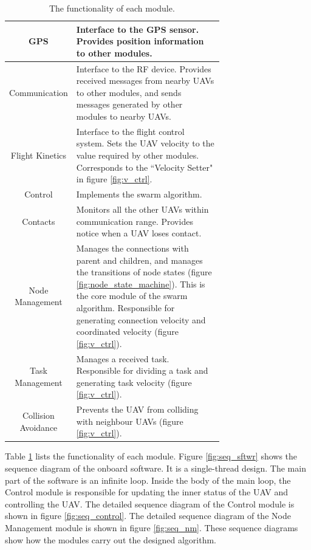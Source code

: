 \begin{table}[htbp]
\centering
\caption[Modules of onboard software.]
{The functionality of each module.}
\label{tbl:modules}
\begin{tabular}{c|p{0.7\linewidth}}
  \hline
  GPS & Interface to the GPS sensor. Provides position information to other modules.  \\
  \hline
  Communication & Interface to the RF device.
                  Provides received messages from nearby UAVs to other modules,
                  and sends messages generated by other modules to nearby UAVs. \\
  \hline
  Flight Kinetics & Interface to the flight control system.
                    Sets the UAV velocity to the value required by other modules.
                    Corresponds to the ``Velocity Setter" in figure \ref{fig:v_ctrl}. \\
  \hline
  Control & Implements the swarm algorithm. \\
  \hline
  Contacts & Monitors all the other UAVs within communication range.
             Provides notice when a UAV loses contact. \\
  \hline
  Node Management & Manages the connections with parent and children,
                    and manages the transitions of node states
                    (figure \ref{fig:node_state_machine}).
                    This is the core module of the swarm algorithm.
                    Responsible for generating connection velocity and
                    coordinated velocity (figure \ref{fig:v_ctrl}). \\
  \hline
  Task Management & Manages a received task.
                    Responsible for dividing a task
                    and generating task velocity (figure \ref{fig:v_ctrl}). \\
  \hline
  Collision Avoidance & Prevents the UAV from colliding with neighbour UAVs
                        (figure \ref{fig:v_ctrl}). \\
  \hline
\end{tabular}
\end{table}

Table \ref{tbl:modules} lists the functionality of each module.
Figure \ref{fig:seq_sftwr} shows the sequence diagram of the onboard software.
It is a single-thread design.
The main part of the software is an infinite loop.
Inside the body of the main loop, the Control module is responsible for
updating the inner status of the UAV and controlling the UAV.
The detailed sequence diagram of the Control module
is shown in figure \ref{fig:seq_control}.
The detailed sequence diagram of the Node Management module
is shown in figure \ref{fig:seq_nm}.
These sequence diagrams show how the modules carry out the designed algorithm.

